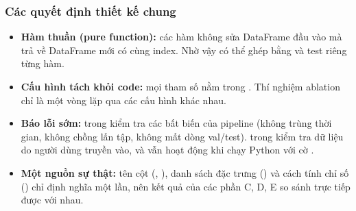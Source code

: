 \subsubsection{Các quyết định thiết kế chung}\label{sec:impl-design}
\begin{itemize}
  \item \textbf{Hàm thuần (pure function):} các hàm  không sửa DataFrame đầu vào mà trả về DataFrame
        mới có cùng index. Nhờ vậy có thể ghép bằng  và test riêng từng hàm.
  \item \textbf{Cấu hình tách khỏi code:} mọi tham số nằm trong . Thí nghiệm ablation chỉ
        là một vòng lặp qua các cấu hình khác nhau.
  \item \textbf{Báo lỗi sớm:}  trong  kiểm tra các bất biến của pipeline (không
        trùng thời gian, không chồng lấn tập, không mất dòng val/test).  trong
         kiểm tra dữ liệu do người dùng truyền vào, và vẫn hoạt động khi chạy Python với
        cờ .
  \item \textbf{Một nguồn sự thật:} tên cột (, ), danh sách đặc trưng
        () và cách tính chỉ số () chỉ định nghĩa một lần, nên kết quả của
        các phần C, D, E so sánh trực tiếp được với nhau.
\end{itemize}
